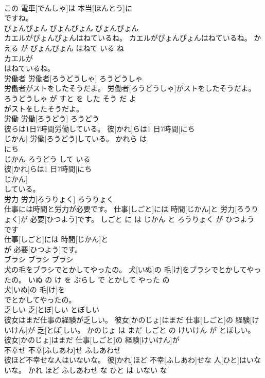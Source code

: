 \documentclass[8pt]{extreport}
\begin{document}
\begin{CJK}{UTF8}{min}
\\	この 電車[でんしゃ]は 本当[ほんとう]に
\\	ですね。			
\\	ぴょんぴょん	ぴょんぴょん	ぴょんぴょん	
\\	カエルがぴょんぴょんはねているね。	カエルがぴょんぴょんはねているね。	かえる が ぴょんぴょん はねて いる ね	
\\	カエルが
\\	はねているね。			
\\	労働者	労働者[ろうどうしゃ]	ろうどうしゃ	
\\	労働者がストをしたそうだよ。	労働者[ろうどうしゃ]がストをしたそうだよ。	ろうどうしゃ が すと を した そう だ よ	
\\	がストをしたそうだよ。			
\\	労働	労働[ろうどう]	ろうどう	
\\	彼らは1日7時間労働している。	彼[かれ]らは1 日7時間[にち 
\\	じかん] 労働[ろうどう]している。	かれら は 
\\	にち 
\\	じかん ろうどう して いる	
\\	彼[かれ]らは1 日7時間[にち 
\\	じかん]
\\	している。			
\\	労力	労力[ろうりょく]	ろうりょく	
\\	仕事には時間と労力が必要です。	仕事[しごと]には 時間[じかん]と 労力[ろうりょく]が 必要[ひつよう]です。	しごと に は じかん と ろうりょく が ひつよう です	
\\	仕事[しごと]には 時間[じかん]と
\\	が 必要[ひつよう]です。			
\\	ブラシ	ブラシ	ブラシ	
\\	犬の毛をブラシでとかしてやったの。	犬[いぬ]の 毛[け]をブラシでとかしてやったの。	いぬ の け を ぶらし で とかして やった の	
\\	犬[いぬ]の 毛[け]を
\\	でとかしてやったの。			
\\	乏しい	乏[とぼ]しい	とぼしい	
\\	彼女はまだ仕事の経験が乏しい。	彼女[かのじょ]はまだ 仕事[しごと]の 経験[けいけん]が 乏[とぼ]しい。	かのじょ は まだ しごと の けいけん が とぼしい。	
\\	彼女[かのじょ]はまだ 仕事[しごと]の 経験[けいけん]が
\\	不幸せ	不幸[ふしあわ]せ	ふしあわせ	
\\	彼ほど不幸せな人はいないな。	彼[かれ]ほど 不幸[ふしあわ]せな 人[ひと]はいないな。	かれ ほど ふしあわせ な ひと は いない な	

\end{CJK}
\end{document}
